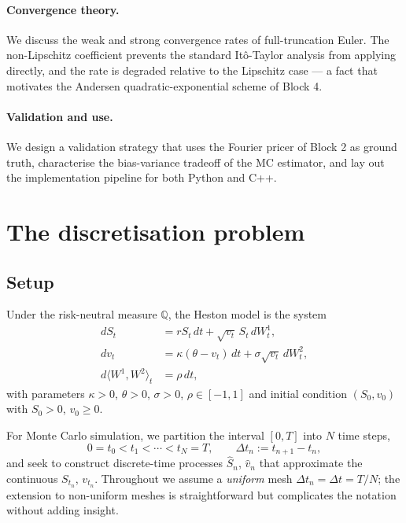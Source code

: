 \documentclass[11pt]{article}
\theoremstyle{plain}
\theoremstyle{definition}
\theoremstyle{remark}
\begin{document}
\paragraph{Convergence theory.} We discuss the weak and strong convergence rates of full-truncation Euler. The non-Lipschitz coefficient prevents the standard Itô-Taylor analysis from applying directly, and the rate is degraded relative to the Lipschitz case --- a fact that motivates the Andersen quadratic-exponential scheme of Block 4.

\paragraph{Validation and use.} We design a validation strategy that uses the Fourier pricer of Block 2 as ground truth, characterise the bias-variance tradeoff of the MC estimator, and lay out the implementation pipeline for both Python and C++.

\section{The discretisation problem}

\subsection{Setup}

Under the risk-neutral measure $\mathbb{Q}$, the Heston model is the system
\begin{align}
    dS_t &= r S_t\,dt + \sqrt{v_t}\, S_t\,dW^1_t,                                \label{eq:heston-S}\\
    dv_t &= \kappa(\theta - v_t)\,dt + \sigma\sqrt{v_t}\,dW^2_t,                 \label{eq:heston-v}\\
    d\langle W^1, W^2\rangle_t &= \rho\,dt,                                      \label{eq:heston-corr}
\end{align}
with parameters $\kappa > 0$, $\theta > 0$, $\sigma > 0$, $\rho \in [-1, 1]$ and initial condition $(S_0, v_0)$ with $S_0 > 0$, $v_0 \geq 0$.

For Monte Carlo simulation, we partition the interval $[0, T]$ into $N$ time steps,
\[
    0 = t_0 < t_1 < \cdots < t_N = T, \qquad \Delta t_n := t_{n+1} - t_n,
\]
and seek to construct discrete-time processes $\hat S_n$, $\hat v_n$ that approximate the continuous $S_{t_n}$, $v_{t_n}$. Throughout we assume a \emph{uniform} mesh $\Delta t_n = \Delta t = T/N$; the extension to non-uniform meshes is straightforward but complicates the notation without adding insight.
\end{document}

